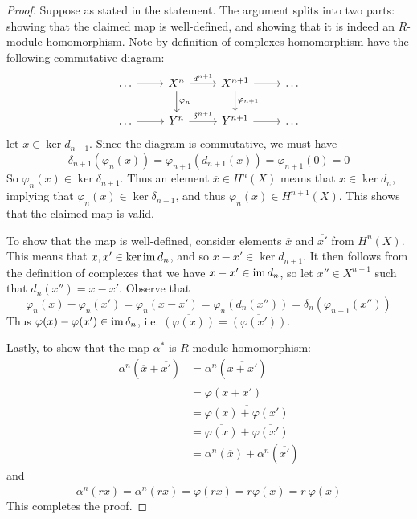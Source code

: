 \begin{proof}
    Suppose as stated in the statement. The argument splits into two parts: showing that the claimed map is well-defined, and showing that it is indeed an $R$-module homomorphism. Note by definition of complexes homomorphism have the following commutative diagram:
    \[\begin{tikzcd} [sep = small]
	\dots && {X^{n}} && {X^{n+1}} && \dots \\
	\\
	\dots && {Y^{n}} && {Y^{n+1}} && \dots
	\arrow["", from=1-1, to=1-3]
	\arrow["{d^{n+1}}", from=1-3, to=1-5]
	\arrow["{\varphi_{n}}", from=1-3, to=3-3]
	\arrow["", from=1-5, to=1-7]
	\arrow["{\varphi_{n+1}}", from=1-5, to=3-5]
	\arrow["", from=3-1, to=3-3]
	\arrow["{\delta^{n+1}}", from=3-3, to=3-5]
	\arrow["", from=3-5, to=3-7]
    \end{tikzcd}\]
    let $x\in \ker d_{n+1}$. Since the diagram is commutative, we must have
    \[\delta_{n+1}(\varphi_n(x)) = \varphi_{n+1}(d_{n+1}(x))=\varphi_{n+1}(0) = 0\]
    So $\varphi_n(x) \in \ker \delta_{n+1}$. Thus an element $\overline{x}\in H^n(X)$ means that $x\in \ker d_n$, implying that $\varphi_n(x) \in \ker \delta_{n+1}$, and thus $\overline{\varphi_n(x)}\in H^{n+1}(X)$. This shows that the claimed map is valid.

    To show that the map is well-defined, consider elements $\overline{x}$ and $\overline{x'}$ from $H^n(X)$. This means that $x,x'\in \ker\operatorname{im} d_n$, and so $x-x'\in \ker d_{n+1}$. It then follows from the definition of complexes that we have $x-x'\in \operatorname{im} d_n$, so let $x''\in X^{n-1}$ such that $d_n(x'') = x-x'$. Observe that
    \[\varphi_n(x)-\varphi_n(x') = \varphi_n(x-x') = \varphi_n(d_n(x'')) = \delta_{n}(\varphi_{n-1}(x''))\]
    Thus $\varphi(x)-\varphi(x')\in \operatorname{im} \delta_n$, i.e. $\overline{(\varphi(x))} = \overline{(\varphi(x'))}$.

    Lastly, to show that the map $\alpha^*$ is $R$-module homomorphism:
    \begin{align*}
        \alpha^n(\overline{x} + \overline{x'})
        &= \alpha^n(\overline{x+x'})\\
        &= \overline{\varphi(x+x')} \\
        &= \overline{\varphi(x)+\varphi(x')} \\
        &= \overline{\varphi(x)}+\overline{\varphi(x')} \\
        &= \alpha^n(\overline{x}) + \alpha^n(\overline{x'})
    \end{align*}
    and
    \[\alpha^n(r\overline{x}) = \alpha^n(\overline{rx}) = \overline{\varphi(rx)} = \overline{r\varphi(x)} = r\ \overline{\varphi(x)}\]
    This completes the proof.
\end{proof}

